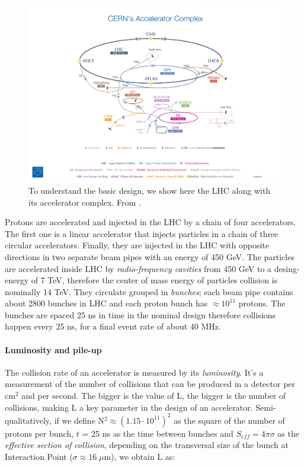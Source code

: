 \begin{figure}
    \centering
    \includegraphics[width=\columnwidth]{gfx/ch1/CERN's-accelerator-complex2013.jpg}
    \caption[The LHC]{To understand the basic design, we show here the LHC along with its accelerator complex. From \cite{acccomplex}.}
    \label{fig:cernacc}
\end{figure}

Protons are accelerated and injected in the LHC by a chain of four accelerators.
The first one is a linear accelerator that injects particles in a chain of three circular
accelerators. Finally, they are injected in the LHC with opposite directions in
two separate beam pipes with an energy of 450 GeV. The particles are accelerated
inside LHC by \emph{radio-frequency cavities} from 450 GeV to a desing-energy of 7 TeV, therefore
the center of mass energy of particles collision is nominally 14 TeV. They circulate
grouped in \emph{bunches}; each beam pipe contains about 2800 bunches in LHC and each
proton bunch has $\approx 10^{11}$ protons. The bunches are spaced 25 ns in time in the nominal
design therefore collisions happen every 25 ns, for a final event rate of about 40 MHz.

\paragraph{Luminosity and pile-up}

The collision rate of an accelerator is measured by its \emph{luminosity}. It's a measurement of the number of collisions that can be produced in a detector per cm$^{2}$ and per second. The bigger is the value of L, the bigger is the number of collisions, making L a key parameter in the design of an accelerator.
Semi-qualitatively, if we define N$^2 \approx (1.15\cdot10^{11})^2$ as the square of the number of protons per bunch, $t$ = 25 ns as the time between bunches and $S_{eff} = 4\pi\sigma$ as the \emph{effective section of collision}, depending on the transversal size of the bunch at Interaction Point ($\sigma \approx 16 \; \mu$m), we obtain L as:

